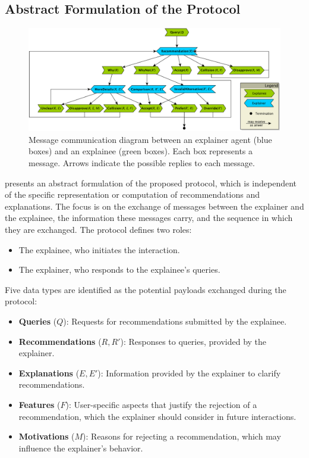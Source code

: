 \subsection{Abstract Formulation of the Protocol}
\label{subsec:abstract-formulation-of-the-protocol}
%
\begin{figure}
    \centering
    \includegraphics[width=\linewidth]{figures/pyxmas/user-agent-protocol}
    \caption{
      Message communication diagram between an explainer agent (blue boxes) and an explainee (green boxes).
      Each box represents a message.
      Arrows indicate the possible replies to each message.
    }
    \label{fig:protocol-messages}
\end{figure}
%
 presents an abstract formulation of the proposed protocol, which is independent of the specific representation or computation of recommendations and explanations.
%
The focus is on the exchange of messages between the explainer and the explainee, the information these messages carry, and the sequence in which they are exchanged.
%
The protocol defines two roles:
%
\begin{itemize}
    \item The explainee, who initiates the interaction.
    \item The explainer, who responds to the explainee's queries.
\end{itemize}
%
Five data types are identified as the potential payloads exchanged during the protocol:
%
\begin{itemize}
    \item \textbf{Queries} (\(Q\)): Requests for recommendations submitted by the explainee.
    \item \textbf{Recommendations} (\(R, R'\)): Responses to queries, provided by the explainer.
    \item \textbf{Explanations} (\(E, E'\)): Information provided by the explainer to clarify recommendations.
    \item \textbf{Features} (\(F\)): User-specific aspects that justify the rejection of a recommendation, which the explainer should consider in future interactions.
    \item \textbf{Motivations} (\(M\)): Reasons for rejecting a recommendation, which may influence the explainer's behavior.
\end{itemize}

